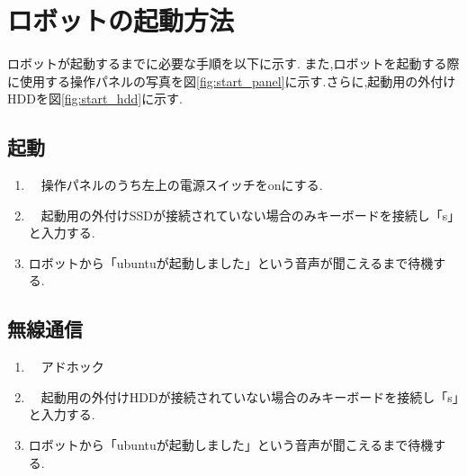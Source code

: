 \section{ロボットの起動方法}
ロボットが起動するまでに必要な手順を以下に示す.
また,ロボットを起動する際に使用する操作パネルの写真を図\ref{fig:start_panel}に示す.さらに,起動用の外付けHDDを図\ref{fig:start_hdd}に示す.
\subsection{起動}
\begin{enumerate}
\item　操作パネルのうち左上の電源スイッチをonにする.
\item　起動用の外付けSSDが接続されていない場合のみキーボードを接続し「s」と入力する.
\item ロボットから「ubuntuが起動しました」という音声が聞こえるまで待機する.
\end{enumerate}
\subsection{無線通信}
\begin{enumerate}
\item　アドホック
\item　起動用の外付けHDDが接続されていない場合のみキーボードを接続し「s」と入力する.
\item ロボットから「ubuntuが起動しました」という音声が聞こえるまで待機する.
\end{enumerate}
